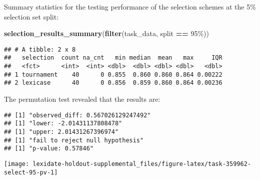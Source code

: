 \documentclass[
]{book}
\newenvironment{Shaded}{\begin{snugshade}}{\end{snugshade}}
\newcommand{\AttributeTok}[1]{\textcolor[rgb]{0.13,0.29,0.53}{#1}}
\newcommand{\DecValTok}[1]{\textcolor[rgb]{0.00,0.00,0.81}{#1}}
\newcommand{\FunctionTok}[1]{\textcolor[rgb]{0.13,0.29,0.53}{\textbf{#1}}}
\newcommand{\NormalTok}[1]{#1}
\newcommand{\OtherTok}[1]{\textcolor[rgb]{0.56,0.35,0.01}{#1}}
\newcommand{\SpecialCharTok}[1]{\textcolor[rgb]{0.81,0.36,0.00}{\textbf{#1}}}
\newcommand{\StringTok}[1]{\textcolor[rgb]{0.31,0.60,0.02}{#1}}
\begin{document}
Summary statistics for the testing performance of the selection schemes at the 5\% selection set split:

\begin{Shaded}
\begin{Highlighting}[]
\FunctionTok{selection\_results\_summary}\NormalTok{(}\FunctionTok{filter}\NormalTok{(task\_data, split }\SpecialCharTok{==} \StringTok{\textquotesingle{}95\%\textquotesingle{}}\NormalTok{))}
\end{Highlighting}
\end{Shaded}

\begin{verbatim}
## # A tibble: 2 x 8
##   selection  count na_cnt   min median  mean   max     IQR
##   <fct>      <int>  <int> <dbl>  <dbl> <dbl> <dbl>   <dbl>
## 1 tournament    40      0 0.855  0.860 0.860 0.864 0.00222
## 2 lexicase      40      0 0.856  0.859 0.860 0.864 0.00236
\end{verbatim}

The permutation test revealed that the results are:

\begin{Shaded}
\end{Shaded}

\begin{verbatim}
## [1] "observed_diff: 0.567026129247492"
## [1] "lower: -2.01431137808478"
## [1] "upper: 2.01431267396974"
## [1] "fail to reject null hypothesis"
## [1] "p-value: 0.57846"
\end{verbatim}

\texttt{[image: lexidate-holdout-supplemental\_files/figure-latex/task-359962-select-95-pv-1]}

  
\end{document}
